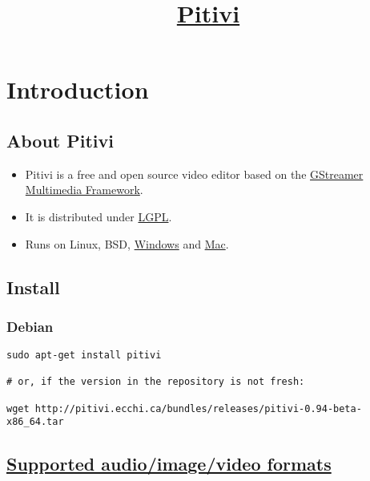 \title{\href{http://www.pitivi.org}{Pitivi}}

\maketitle
\tableofcontents

\chapter{Introduction}

\section{About Pitivi}

\begin{itemize}
\item Pitivi is a free and open source video editor based on the
  \href{http://gstreamer.freedesktop.org}{GStreamer Multimedia
    Framework}.
\item It is distributed under
  \href{http://www.gnu.org/copyleft/lesser.html}{LGPL}.
\item Runs on Linux, BSD,
  \href{http://wiki.pitivi.org/wiki/PiTiVi_on_Windows}{Windows} and
  \href{http://wiki.pitivi.org/wiki/Mac_OS_X}{Mac}.
\end{itemize}


\section{Install}

\subsection{Debian}

\begin{lstlisting}
sudo apt-get install pitivi

# or, if the version in the repository is not fresh:

wget http://pitivi.ecchi.ca/bundles/releases/pitivi-0.94-beta-x86_64.tar
\end{lstlisting}


\section{\href{http://www.pitivi.org/manual/gstreamer.html}{Supported audio/image/video formats}}

